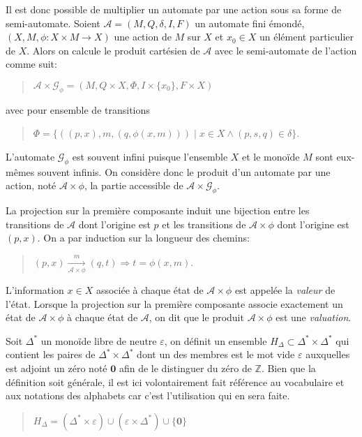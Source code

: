 	Il est donc possible de multiplier un automate par une action sous sa forme de semi-automate. Soient $\mathscr{A} = (M, Q, \delta, I, F)$ un automate fini émondé, $(X, M, \phi : X \times M \to X)$ une action de $M$ sur $X$ et $x_0 \in X$ un élément particulier de $X$. Alors on calcule le produit cartésien de $\mathscr{A}$ avec le semi-automate de l'action comme suit:
	\begin{quotation}
		$\mathscr{A} \times \mathscr{G}_\phi = (M, Q \times X, \Phi, I \times \{x_0\}, F \times X)$
	\end{quotation}
	avec pour ensemble de transitions
	\begin{quotation}
		$\Phi = \{((p,x), m, (q, \phi(x,m))) \mid x \in X \wedge (p, s, q) \in \delta\}$.
	\end{quotation}
	
	L'automate $\mathscr{G}_\phi$ est souvent infini puisque l'ensemble $X$ et le monoïde $M$ sont eux-mêmes souvent infinis. On considère donc le produit d'un automate par une action, noté $\mathscr{A} \times \phi$, la partie accessible de $\mathscr{A} \times \mathscr{G}_\phi$.
	
	La projection sur la première composante induit une bijection entre les transitions de $\mathscr{A}$ dont l'origine est $p$ et les transitions de $\mathscr{A} \times \phi$ dont l'origine est $(p,x)$. On a par induction sur la longueur des chemins:
	\begin{quotation}
		$(p,x) \xrightarrow[\mathscr{A} \times \phi]{m} (q,t) \Rightarrow t = \phi(x,m)$.
	\end{quotation}
	
	L'information $x \in X$ associée à chaque état de $\mathscr{A} \times \phi$ est appelée la \emph{valeur} de l'état. Lorsque la projection sur la première composante associe exactement un état de $\mathscr{A} \times \phi$ à chaque état de $\mathscr{A}$, on dit que le produit $\mathscr{A} \times \phi$ est une \emph{valuation}.
	
	Soit $\Delta^*$ un monoïde libre de neutre $\varepsilon$, on définit un ensemble $H_\Delta \subset \Delta^* \times \Delta^*$ qui contient les paires de $\Delta^* \times \Delta^*$ dont un des membres est le mot vide $\varepsilon$ auxquelles est adjoint un zéro noté $\mathbf{0}$ afin de le distinguer du zéro de $\mathbb{Z}$. Bien que la définition soit générale, il est ici volontairement fait référence au vocabulaire et aux notations des alphabets car c'est l'utilisation qui en sera faite.
	
	\begin{quotation}
		$H_\Delta = (\Delta^* \times \varepsilon) \cup (\varepsilon \times \Delta^*) \cup \{\mathbf{0}\}$
	\end{quotation}
	
